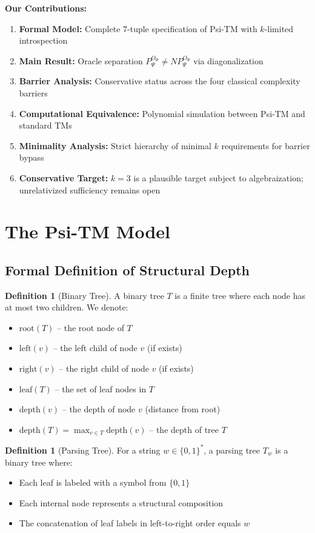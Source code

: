 \documentclass[11pt]{article}
\theoremstyle{plain}
\theoremstyle{definition}
\newtheorem{definition}[theorem]{Definition}
\begin{document}
\textbf{Our Contributions:}
\begin{enumerate}
\item \textbf{Formal Model:} Complete 7-tuple specification of Psi-TM with $k$-limited introspection
\item \textbf{Main Result:} Oracle separation $P^{O_\Psi}_\Psi \neq NP^{O_\Psi}_\Psi$ via diagonalization
\item \textbf{Barrier Analysis:} Conservative status across the four classical complexity barriers
\item \textbf{Computational Equivalence:} Polynomial simulation between Psi-TM and standard TMs
\item \textbf{Minimality Analysis:} Strict hierarchy of minimal $k$ requirements for barrier bypass
\item \textbf{Conservative Target:} $k=3$ is a plausible target subject to algebraization; unrelativized sufficiency remains open
\end{enumerate}

\section{The Psi-TM Model}

\subsection{Formal Definition of Structural Depth}

\begin{definition}[Binary Tree]
A binary tree $T$ is a finite tree where each node has at most two children. We denote:
\begin{itemize}
\item $\text{root}(T)$ -- the root node of $T$
\item $\text{left}(v)$ -- the left child of node $v$ (if exists)
\item $\text{right}(v)$ -- the right child of node $v$ (if exists)
\item $\text{leaf}(T)$ -- the set of leaf nodes in $T$
\item $\text{depth}(v)$ -- the depth of node $v$ (distance from root)
\item $\text{depth}(T) = \max_{v \in T} \text{depth}(v)$ -- the depth of tree $T$
\end{itemize}
\end{definition}

\begin{definition}[Parsing Tree]
For a string $w \in \{0,1\}^*$, a parsing tree $T_w$ is a binary tree where:
\begin{itemize}
\item Each leaf is labeled with a symbol from $\{0,1\}$
\item Each internal node represents a structural composition
\item The concatenation of leaf labels in left-to-right order equals $w$
\end{itemize}
\end{definition}
\end{document}
